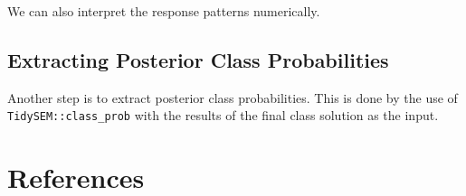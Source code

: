 \documentclass[
  ,man,floatsintext]{apa6}
\begin{document}
We can also interpret the response patterns numerically.

\hypertarget{extracting-posterior-class-probabilities}{%
\subsection{Extracting Posterior Class Probabilities}\label{extracting-posterior-class-probabilities}}

Another step is to extract posterior class probabilities.
This is done by the use of \texttt{TidySEM::class\_prob}
with the results of the final class solution as the input.

\newpage

\hypertarget{references}{%
\section*{References}\label{references}}
\end{document}
